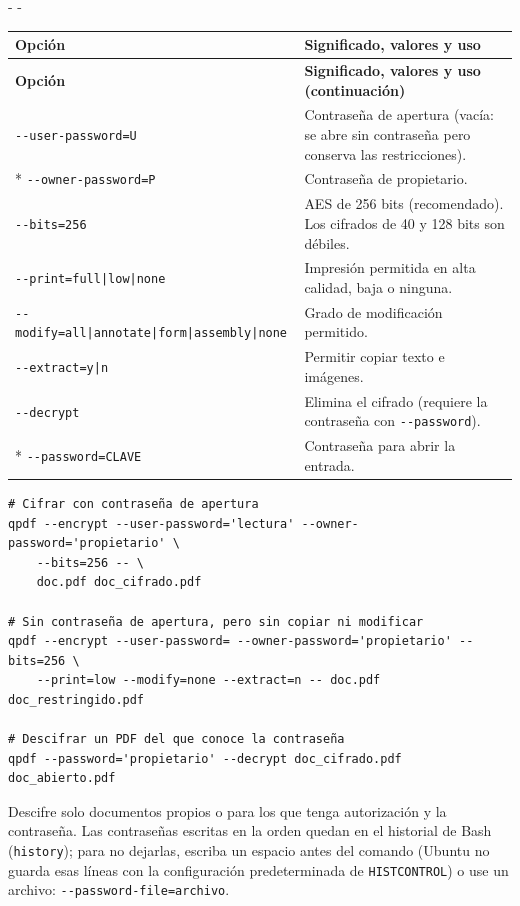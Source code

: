 \documentclass[11pt,a4paper]{article}
\makeatletter
\newcommand{\necesitaespacio}[1]{\par\penalty-100\begingroup
	\setlength{\dimen@}{#1}\dimen@ii\pagegoal\advance\dimen@ii-\pagetotal
	\ifdim\dimen@>\dimen@ii\ifdim\dimen@ii>\z@\vfil\fi\penalty-\@M\fi\endgroup}
\newenvironment{opciones}[1][Opción]{%
	\par\begingroup\small
	\begin{longtable}{L{4.25cm}L{11.2cm}}
		\toprule\rowcolor{tablacab}\cab{#1} & \cab{Significado, valores y uso} \\ \midrule
		\endfirsthead
		\toprule\rowcolor{tablacab}\cab{#1} & \cab{Significado, valores y uso (continuación)} \\ \midrule
		\endhead
		\bottomrule
		\endfoot}
	{\end{longtable}\endgroup}
\newcommand{\cmd}[1]{\texttt{\textcolor{colcmd}{#1}}}      %
\newcommand{\opt}[1]{\texttt{\textcolor{colopt}{#1}}}      %
\newcommand{\cab}[1]{\textbf{#1}}
\makeatother
\begin{document}
	\necesitaespacio{20\baselineskip}
	\begin{opciones}
		\opt{-{}-user-\allowbreak{}password=\allowbreak{}U} & Contraseña de apertura (vacía: se abre sin contraseña pero conserva las restricciones).\\*
		\opt{-{}-owner-\allowbreak{}password=\allowbreak{}P} & Contraseña de propietario.\\
		\opt{-{}-bits=256} & AES de 256 bits (recomendado). Los cifrados de 40 y 128 bits son débiles.\\
		\opt{-{}-print=\allowbreak{}full|\allowbreak{}low|\allowbreak{}none} & Impresión permitida en alta calidad, baja o ninguna.\\
		\opt{-{}-modify=\allowbreak{}all|\allowbreak{}annotate|\allowbreak{}form|\allowbreak{}assembly|\allowbreak{}none} & Grado de modificación permitido.\\
		\opt{-{}-extract=y|n} & Permitir copiar texto e imágenes.\\
		\opt{-{}-decrypt} & Elimina el cifrado (requiere la contraseña con \opt{-{}-password}).\\*
		\opt{-{}-password=\allowbreak{}CLAVE} & Contraseña para abrir la entrada.\\
	\end{opciones}
	
	\begin{lstlisting}
# Cifrar con contraseña de apertura
qpdf --encrypt --user-password='lectura' --owner-password='propietario' \
    --bits=256 -- \
    doc.pdf doc_cifrado.pdf

# Sin contraseña de apertura, pero sin copiar ni modificar
qpdf --encrypt --user-password= --owner-password='propietario' --bits=256 \
    --print=low --modify=none --extract=n -- doc.pdf doc_restringido.pdf

# Descifrar un PDF del que conoce la contraseña
qpdf --password='propietario' --decrypt doc_cifrado.pdf doc_abierto.pdf
\end{lstlisting}
	
	\begin{importante}
		Descifre solo documentos propios o para los que tenga autorización y la contraseña. Las contraseñas escritas en la orden quedan en el historial de Bash (\cmd{history}); para no dejarlas, escriba un espacio antes del comando (Ubuntu no guarda esas líneas con la configuración predeterminada de \texttt{HISTCONTROL}) o use un archivo: \opt{-{}-password-\allowbreak{}file=\allowbreak{}archivo}.
	\end{importante}
	
\end{document}
